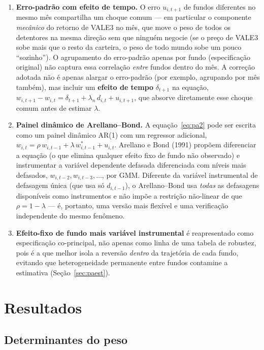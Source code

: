 \documentclass[12pt,a4paper]{article}
\begin{document}
\begin{enumerate}[topsep=2pt,itemsep=1pt]
\item[(a)] \textbf{Erro-padrão com efeito de tempo.} O erro $u_{i,t+1}$ de fundos diferentes no
mesmo mês compartilha um choque comum --- em particular o componente \emph{mecânico} do retorno
de VALE3 no mês, que move o peso de todos os detentores na mesma direção sem que ninguém negocie
(se o preço de VALE3 sobe mais que o resto da carteira, o peso de todo mundo sobe um pouco
``sozinho''). O agrupamento do erro-padrão apenas por fundo (especificação original) não captura
essa correlação \emph{entre} fundos dentro do mês. A correção adotada não é apenas alargar o
erro-padrão (por exemplo, agrupando por mês também), mas incluir um \textbf{efeito de tempo}
$\delta_{t+1}$ na equação, $w_{i,t+1}-w_{i,t} = \delta_{t+1} + \lambda_n\,d_{i,t} + u_{i,t+1}$,
que absorve diretamente esse choque comum antes de estimar $\lambda$.
\item[(b)] \textbf{Painel dinâmico de Arellano--Bond.} A equação~\eqref{eq:pa2} pode ser escrita
como um painel dinâmico AR(1) com um regressor adicional, $w_{i,t}=\rho\,w_{i,t-1} +
\lambda\,w^{*}_{i,t-1}+u_{i,t}$. Arellano e Bond (1991) propõem diferenciar a equação (o que
elimina qualquer efeito fixo de fundo não observado) e instrumentar a variável dependente
defasada diferenciada com níveis mais defasados, $w_{i,t-2}, w_{i,t-3},\dots$, por GMM. Diferente
da variável instrumental de defasagem única (que usa só $d_{i,t-1}$), o Arellano--Bond usa
\emph{todas} as defasagens disponíveis como instrumentos e não impõe a restrição não-linear de
que $\rho=1-\lambda$ --- é, portanto, uma versão mais flexível e uma verificação independente do
mesmo fenômeno.
\item[(c)] \textbf{Efeito-fixo de fundo mais variável instrumental} é reapresentado como
especificação co-principal, não apenas como linha de uma tabela de robustez, pois é a que
melhor isola a reversão \emph{dentro} da trajetória de cada fundo, evitando que heterogeneidade
permanente entre fundos contamine a estimativa (Seção~\ref{sec:paest}).
\end{enumerate}

\section{Resultados}

\subsection{Determinantes do peso}
\label{sec:det}
\label{sec:winsor}
\end{document}
